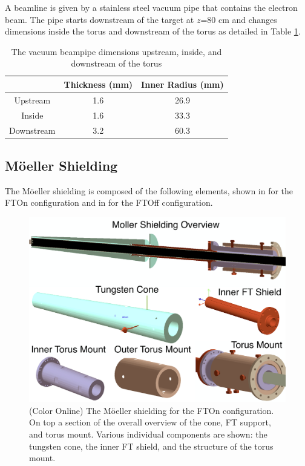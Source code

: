 A beamline is given by a stainless steel vacuum pipe that contains the electron beam.
The pipe starts downstream of the target at $z$=80 cm and changes dimensions inside
the torus and downstream of the torus as detailed in Table \ref{tab:beampipe}.

\begin{table}[h]
	\begin{center}
		\begin{tabular}{| c | c | c |}
			\hline \hline
			                & Thickness (mm) & Inner Radius (mm)   \\
			\hline
              Upstream      &    1.6     &    26.9 \\
              Inside        &    1.6     &    33.3 \\
            Downstream      &    3.2     &    60.3 \\
			\hline \hline
		\end{tabular}
	\end{center}
	\caption{The vacuum beampipe dimensions upstream, inside, and downstream of the torus}\label{tab:beampipe}
\end{table}


\subsection{M\"oeller Shielding}
The M\"oeller shielding is composed of the following elements, shown in  for the FTOn configuration
and in  for the FTOff configuration.

\begin{figure}
	\centering
	\includegraphics[width=0.99\columnwidth,keepaspectratio]{img/moellerShieldingFTOn.png}
	\caption{(Color Online) The M\"oeller shielding for the FTOn configuration. On top a section of the overall overview of the cone, FT support, and torus mount.
		     Various individual components are shown: the tungsten cone, the inner FT shield, and the structure of the torus mount.}
	\label{fig:moellerShieldingFTOn}
\end{figure}

